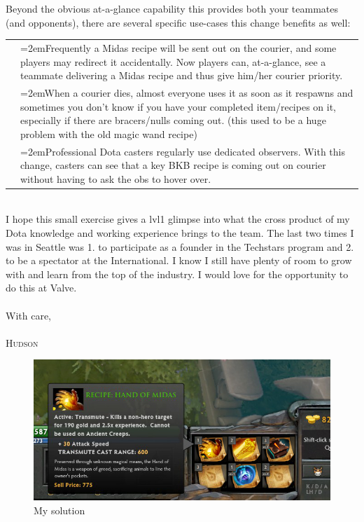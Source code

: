 \documentclass[10pt, letterpaper, UTF-8]{article}
\begin{document}
Beyond the obvious at-a-glance capability this provides both your teammates (and opponents), there are several specific use-cases this change benefits as well:
\smallskip\\
\begin{tabular}{p{.2in}|p{15cm}}
&\hangindent=2emFrequently a Midas recipe will be sent out on the courier, and some players may redirect it accidentally. Now players can, at-a-glance, see a teammate delivering a Midas recipe and thus give him/her courier priority.\\
&\hangindent=2emWhen a courier dies, almost everyone uses it as soon as it respawns and sometimes you don't know if you have your completed item/recipes on it, especially if there are bracers/nulls coming out. (this used to be a huge problem with the old magic wand recipe)\\
&\hangindent=2emProfessional Dota casters regularly use dedicated observers. With this change, casters can see that a key BKB recipe is coming out on courier without having to ask the obs to hover over.\\
\end{tabular}
\medskip\\
I hope this small exercise gives a lvl1 glimpse into what the cross product of my Dota knowledge and working experience brings to the team. The last two times I was in Seattle was 1. to participate as a founder in the Techstars program and 2. to be a spectator at the International. I know I still have plenty of room to grow with and learn from the top of the industry. I would love for the opportunity to do this at Valve.\\
\bigskip\\
With care,\\
\\

\bigskip
\noindent 
\textsc{Hudson}\\

\newpage
\begin{figure}[p]
\includegraphics[width=1\textwidth]{recipeseethrucopy}
\caption{My solution}
\end{figure}
\end{document}
